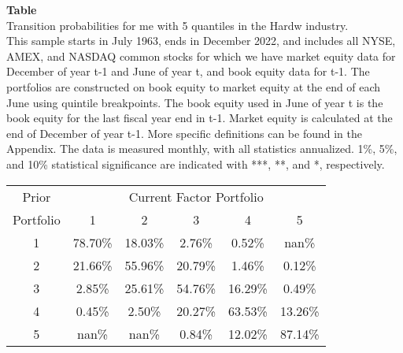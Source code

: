 \begin{table*}[ht!]
\raggedright
{}
\label{tab: transition_probs_me_Hardw_with_5_quantiles}
\textbf{Table \thetable} \\
Transition probabilities for me with 5 quantiles in the Hardw industry. \\
\hspace*{1em}This sample starts in July 1963, ends in December 2022, and includes all NYSE, AMEX, and NASDAQ common stocks for which we have market equity data for December of year t-1 and June of year t, and book equity data for t-1. The portfolios are constructed on book equity to market equity at the end of each June using quintile breakpoints.  The book equity used in June of year t is the book equity for the last fiscal year end in t-1.  Market equity is calculated at the end of December of year t-1.  More specific definitions can be found in the Appendix.  The data is measured monthly, with all statistics annualized.  1\%, 5\%, and 10\% statistical significance are indicated with ***, **, and *, respectively. \\
\vspace{0.5em}
\centering
\begin{adjustbox}{max width=\textwidth}
\begin{tabular}{@{}cccccc@{}}
\toprule
Prior & \multicolumn{5}{c}{Current Factor Portfolio} \\
Portfolio & 1 & 2 & 3 & 4 & 5 \\
\midrule
1 & 78.70\% & 18.03\% & 2.76\% & 0.52\% & nan\% \\
2 & 21.66\% & 55.96\% & 20.79\% & 1.46\% & 0.12\% \\
3 & 2.85\% & 25.61\% & 54.76\% & 16.29\% & 0.49\% \\
4 & 0.45\% & 2.50\% & 20.27\% & 63.53\% & 13.26\% \\
5 & nan\% & nan\% & 0.84\% & 12.02\% & 87.14\% \\
\bottomrule
\end{tabular}
\end{adjustbox}
\end{table*}